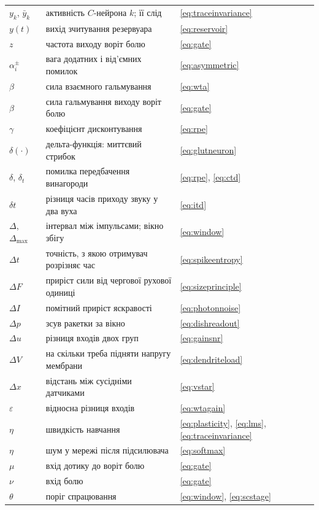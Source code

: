 \begin{center}
\begin{longtable}{>{\raggedright}p{2.0cm}>{\raggedright}p{9.6cm}>{\raggedright\arraybackslash}p{2.4cm}}
$y_k$, $\bar y_k$ & активність $C$-нейрона $k$; її слід & \eqref{eq:traceinvariance} \\
$y(t)$ & вихід зчитування резервуара & \eqref{eq:reservoir} \\
$z$ & частота виходу воріт болю & \eqref{eq:gate} \\
\midrule
$\alpha_i^\pm$ & вага додатних і від'ємних помилок & \eqref{eq:asymmetric} \\
$\beta$ & сила взаємного гальмування & \eqref{eq:wta} \\
$\beta$ & сила гальмування виходу воріт болю & \eqref{eq:gate} \\
$\gamma$ & коефіцієнт дисконтування & \eqref{eq:rpe} \\
$\delta(\cdot)$ & дельта-функція: миттєвий стрибок & \eqref{eq:glutneuron} \\
$\delta$, $\delta_t$ & помилка передбачення винагороди & \eqref{eq:rpe}, \eqref{eq:ctd} \\
$\delta t$ & різниця часів приходу звуку у два вуха & \eqref{eq:itd} \\
$\Delta$, $\Delta_{\max}$ & інтервал між імпульсами; вікно збігу & \eqref{eq:window} \\
$\Delta t$ & точність, з якою отримувач розрізняє час & \eqref{eq:spikeentropy} \\
$\Delta F$ & приріст сили від чергової рухової одиниці & \eqref{eq:sizeprinciple} \\
$\Delta I$ & помітний приріст яскравості & \eqref{eq:photonnoise} \\
$\Delta p$ & зсув ракетки за вікно & \eqref{eq:dishreadout} \\
$\Delta u$ & різниця входів двох груп & \eqref{eq:gainsnr} \\
$\Delta V$ & на скільки треба підняти напругу мембрани & \eqref{eq:dendriteload} \\
$\Delta x$ & відстань між сусідніми датчиками & \eqref{eq:vstar} \\
$\varepsilon$ & відносна різниця входів & \eqref{eq:wtagain} \\
$\eta$ & швидкість навчання & \eqref{eq:plasticity}, \eqref{eq:lms}, \eqref{eq:traceinvariance} \\
$\eta$ & шум у мережі після підсилювача & \eqref{eq:softmax} \\
$\mu$ & вхід дотику до воріт болю & \eqref{eq:gate} \\
$\nu$ & вхід болю & \eqref{eq:gate} \\
$\theta$ & поріг спрацювання & \eqref{eq:window}, \eqref{eq:scstage} \\

\end{longtable}
\end{center}
